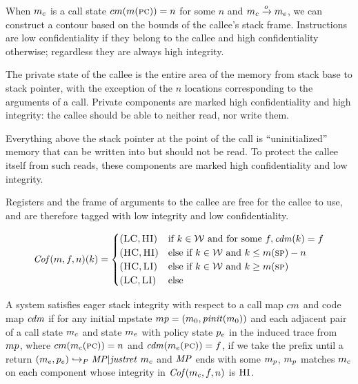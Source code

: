 \documentclass[acmsmall,review,anonymous]{acmart}\settopmatter{printfolios=true,printccs=false,printacmref=false}
\begin{document}

  When \(m_c\) is a call state \(cm(m(\textsc{pc})) = n\) for some
  \(n\) and \(m_c \xrightarrow{o} m_e\), we can construct a contour
  based on the bounds of the callee's stack frame. Instructions are low
  confidentiality if they belong to the callee and high confidentiality
  otherwise; regardless they are always high integrity.
 
  The private state of the callee is the entire area of the memory from stack
  base to stack pointer, with the exception of the $n$ locations
  corresponding to the arguments of a call. Private components are marked
  high confidentiality and high integrity: the callee should be able to
  neither read, nor write them.
  
  Everything above the stack pointer at the point of the call is
  ``uninitialized'' memory that can be written into but should not be
  read. To protect the callee itself from such reads, these components
  are marked high confidentiality and low integrity.
 
  Registers and the frame of arguments to the callee are free for the
  callee to use, and are therefore tagged with low integrity and low
  confidentiality. 

 \[\mathit{Cof}(m,f,n)(k) =
  \begin{cases}
    (\textsc{LC},\textsc{HI}) & \text{if } k \in {\mathcal W}
                         \text{ and for some } f, \mathit{cdm}(k) = f \\
    (\textsc{HC},\textsc{HI}) & \text{else if } k \in {\mathcal W}
                          \text{ and } k \leq m(\textsc{sp}) - n \\
    (\textsc{HC},\textsc{LI}) & \text{else if } k \in {\mathcal W}
                         \text{ and } k \geq m(\textsc{sp}) \\
    (\textsc{LC},\textsc{LI}) & \text{else} \\
  \end{cases}\]


  A system satisfies eager stack integrity with respect to a call map
  \(cm\) and code map \(\mathit{cdm}\) if for any initial mpstate
  \(mp = (m_0,\mathit{pinit}(m_0))\) and each
  adjacent pair of a call state \(m_c\) and state \(m_e\) with policy
  state \(p_e\) in the induced trace from \(mp\), where
  \(cm(m_c(\textsc{pc})) = n\) and \(\mathit{cdm}(m_e(\textsc{pc})) =
  f\), if we take the prefix until a return
  \((m_e,p_e) \hookrightarrow_P \mathit{MP} | \mathit{justret}\ m_c\) and
  \(\mathit{MP}\) ends with some \(m_p\), \(m_p\) matches \(m_c\) on each
  component whose integrity in \(\mathit{Cof}(m_c,f,n)\) is
  \(\textsc{HI}\).
\end{document}
